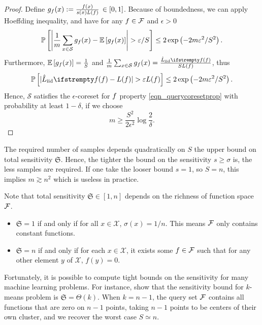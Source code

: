 \begin{proof}
    Define $g_f(x) :=  \frac{f(x)}{s(x) L(f)}  \, \in[0,1]$.
    Because of boundedness, we can apply Hoeffding inequality, and have for any $f \in \mathcal{F}$ and $\epsilon>0$
    \begin{equation*}
        \mathbb{P}\left[\left|\frac{1}{m} \sum_{x \in \mathcal{S}} g_{\query}(x) - \mathbb{E}\left[g_{\query}(x)\right]\right|>\epsilon/S\right] \leq 2 \exp \left(-2 m \epsilon^2/S^2\right).
    \end{equation*}
    Furthermore, $\mathbb{E}\left[g_{f}(x)\right]=\frac{1}{S}$ and $\frac{1}{m} \sum_{x \in \mathcal{S}} g_{\query}(x)=\frac{\estloss{\textrm{iid}}{\query}}{S L(\query)}$, thus
    \begin{equation*}
        \mathbb{P}\left[|\estloss{\textrm{iid}}{\query} - L(\query)|>\epsilon L(\query)\right] \leq 2 \exp \left(-2 m \epsilon^2/S^2\right).
    \end{equation*}
    Hence, $\mathcal{S}$ satisfies the $\epsilon$-coreset for $f$ property \ref{eqn_querycoresetprop} with probability at least $1-\delta$, if we choose
    \begin{equation*}
        m \geq \frac{S^{2}}{2 \epsilon^{2}} \log \frac{2}{\delta}.
    \end{equation*}
\end{proof}






The required number of samples depends quadratically on $S$ the upper bound on total sensitivity $\mathfrak{S}$. Hence, the tighter the bound on the sensitivity $s \geq \sigma$ is, the less samples are required. If one take the looser bound $s=1$, so $S=n$, this implies $m \gtrsim n^2$ which is useless in practice.

Note that total sensitivity $\mathfrak{S} \in [1,n]$ depends on the richness of function space $\mathcal{F}$. 
\begin{itemize}
    \item $\mathfrak{S}=1$ if and only if for all $x\in\mathcal{X}$, $\sigma(x)=1/n$. This means $\mathcal{F}$ only contains constant functions.
    \item $\mathfrak{S}=n$ if and only if for each $x\in \mathcal{X}$, it exists some $f \in \mathcal{F}$ such that for any other element $y$ of $\mathcal{X}$, $f(y)=0$.
\end{itemize}

Fortunately, it is possible to compute tight bounds on the sensitivity for many machine learning problems. For instance, \cite{lucic2016_lineartime_detection_via_sensitivity} show that the sensitivity bound for $k$-means problem is $\mathfrak{S} = \Theta(k)$. When $k = n-1$, the query set $\mathcal{F}$ contains all functions that are zero on $n-1$ points, taking $n-1$ points to be centers of their own cluster, and we recover the worst case $S\simeq n$.



